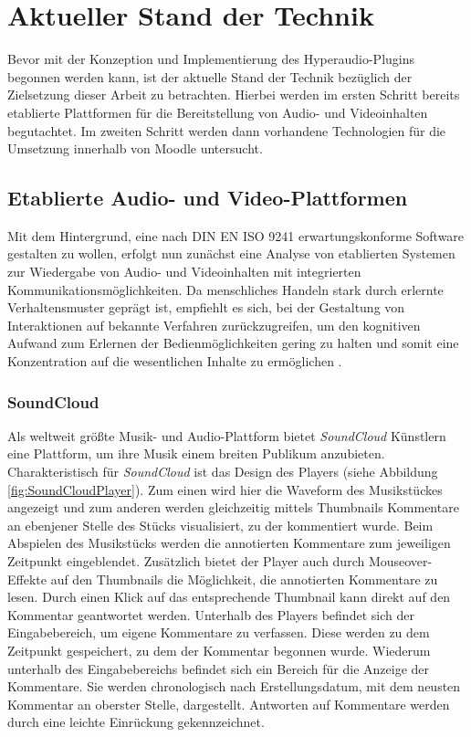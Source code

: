 \section{Aktueller Stand der Technik}
Bevor mit der Konzeption und Implementierung des Hyperaudio-Plugins begonnen werden kann, ist der aktuelle Stand der Technik bezüglich der Zielsetzung dieser Arbeit zu betrachten. Hierbei werden im ersten Schritt bereits etablierte Plattformen für die Bereitstellung von Audio- und Videoinhalten begutachtet. Im zweiten Schritt werden dann vorhandene Technologien für die Umsetzung innerhalb von Moodle untersucht.


\subsection{Etablierte Audio- und Video-Plattformen}

Mit dem Hintergrund, eine nach DIN EN ISO 9241 erwartungskonforme Software gestalten zu wollen, erfolgt nun zunächst eine Analyse von etablierten Systemen zur Wiedergabe von Audio- und Videoinhalten mit integrierten Kommunikationsmöglichkeiten. Da menschliches Handeln stark durch erlernte Verhaltensmuster geprägt ist, empfiehlt es sich, bei der Gestaltung von Interaktionen auf bekannte Verfahren zurückzugreifen, um den kognitiven Aufwand zum Erlernen der Bedienmöglichkeiten gering zu halten und somit eine Konzentration auf die wesentlichen Inhalte zu ermöglichen \citep{erwartungskonformitaet}.


\subsubsection{SoundCloud}

\glqq Als weltweit größte Musik- und Audio-Plattform\grqq{} \citep{soundcloudinfo} bietet \textit{SoundCloud} Künstlern eine Plattform, um ihre Musik einem breiten Publikum anzubieten. Charakteristisch für \textit{SoundCloud} ist das Design des Players (siehe Abbildung \ref{fig:SoundCloudPlayer}). Zum einen wird hier die Waveform des Musikstückes angezeigt und zum anderen werden gleichzeitig mittels Thumbnails Kommentare an ebenjener Stelle des Stücks visualisiert, zu der kommentiert wurde. Beim Abspielen des Musikstücks werden die annotierten Kommentare zum jeweiligen Zeitpunkt eingeblendet. Zusätzlich bietet der Player auch durch Mouseover-Effekte auf den Thumbnails die Möglichkeit, die annotierten Kommentare zu lesen. Durch einen Klick auf das entsprechende Thumbnail kann direkt auf den Kommentar geantwortet werden. Unterhalb des Players befindet sich der Eingabebereich, um eigene Kommentare zu verfassen. Diese werden zu dem Zeitpunkt gespeichert, zu dem der Kommentar begonnen wurde. Wiederum unterhalb des Eingabebereichs befindet sich ein Bereich für die Anzeige der Kommentare. Sie werden chronologisch nach Erstellungsdatum, mit dem neusten Kommentar an oberster Stelle, dargestellt. Antworten auf Kommentare werden durch eine leichte Einrückung gekennzeichnet.

